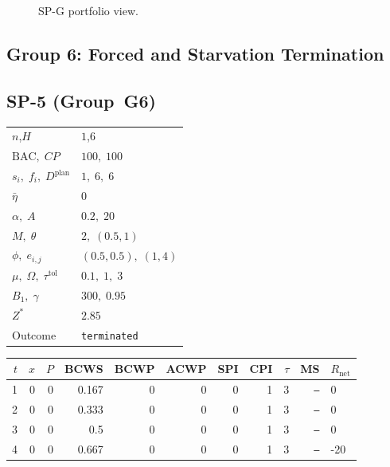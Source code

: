 \documentclass[12pt, a4paper]{article}
\newcommand{\BAC}{\mathrm{BAC}}
\begin{document}
\begin{figure}[htbp]
\begin{tikzpicture}[font=\footnotesize]
\end{tikzpicture}
\caption{SP-G portfolio view.}
\label{fig:spg_portfolio}
\end{figure}

\newpage


\subsection*{Group 6: Forced and Starvation Termination}

\subsection*{SP-5  (Group~G6)}
\begin{center}
\begin{tabular}{ll}
\toprule
$n$,\;$H$ & $1$,\;$6$ \\
$\BAC,\;CP$ & $100,\;100$ \\
$s_i,\;f_i,\;D^{\mathrm{plan}}$ & $1,\;6,\;6$ \\
$\bar\eta$ & $0$ \\
$\alpha,\;A$ & $0.2,\;20$ \\
$M,\;\theta$ & $2,\;(0.5,1)$ \\
$\phi,\;e_{i,j}$ & $(0.5,0.5),\;(1,4)$ \\
$\mu,\;\Omega,\;\tau^{\mathrm{tol}}$ & $0.1,\;1,\;3$ \\
$B_1,\;\gamma$ & $300,\;0.95$ \\
$Z^*$ & $2.85$ \\
Outcome & \texttt{terminated} \\
\bottomrule
\end{tabular}
\end{center}

\begin{center}
\begin{tabular}{rrrrrrrrrrl}
\toprule
$t$ & $x$ & $P$ & BCWS & BCWP & ACWP & SPI & CPI & $\tau$ & MS & $R_{\mathrm{net}}$\\
\midrule
1 & 0 & 0 & 0.167 & 0 & 0 & 0 & 1 & 3 & \texttt{---} & 0 \\
2 & 0 & 0 & 0.333 & 0 & 0 & 0 & 1 & 3 & \texttt{---} & 0 \\
3 & 0 & 0 & 0.5 & 0 & 0 & 0 & 1 & 3 & \texttt{---} & 0 \\
4 & 0 & 0 & 0.667 & 0 & 0 & 0 & 1 & 3 & \texttt{---} & -20 \\
\bottomrule
\end{tabular}
\end{center}
\end{document}
